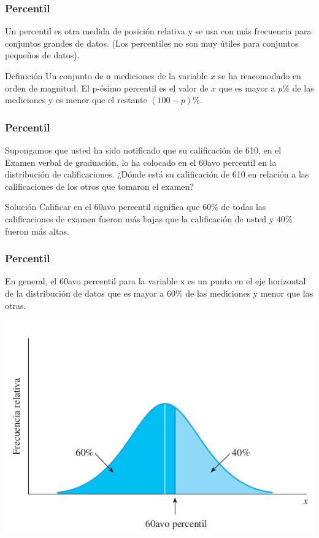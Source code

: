 \documentclass[spanish]{beamer}
\begin{document}
\begin{frame}
\frametitle{Percentil}
Un percentil es otra medida de posición relativa y se usa con más frecuencia para conjuntos grandes de datos. (Los percentiles no son muy útiles para conjuntos pequeños de datos).

\begin{block}{Definición}
Un conjunto de n mediciones de la variable $x$ se ha reacomodado en
orden de magnitud. El p-ésimo percentil es el valor de $x$ que es mayor a $p\%$ de las mediciones y es menor que el restante $(100 - p)\%$.
\end{block}


\end{frame}
\begin{frame}
\frametitle{Percentil}
Supongamos que usted ha sido notificado que su calificación de 610, en el Examen verbal de graduación, lo ha colocado en el 60avo percentil en la distribución de calificaciones. ¿Dónde está su calificación de 610 en relación a las calificaciones de los otros que tomaron el examen?

\vspace{1em}
Solución Calificar en el 60avo percentil significa que $60\%$ de todas las calificaciones de examen fueron más bajas que la calificación de usted y $40\%$ fueron más altas.

\end{frame}
\begin{frame}
\frametitle{Percentil}
En general, el 60avo percentil para la variable x es un punto en el eje horizontal de la distribución de datos que es mayor a 60\% de las mediciones y menor que las otras.

\begin{center}
\includegraphics[scale=0.4]{im25}
\end{center}

\end{frame}
\end{document}
